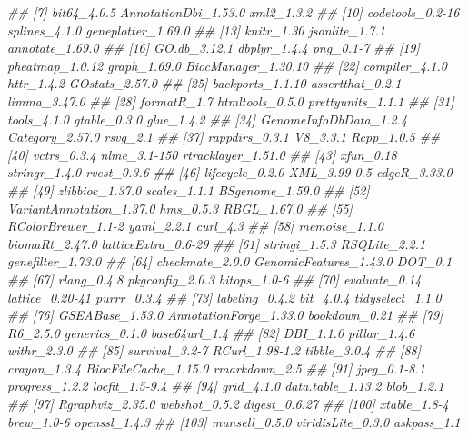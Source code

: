 \documentclass[14pt,]{article}
\newcommand{\hlcom}[1]{\textcolor[rgb]{0.502,0.502,0.502}{\textit{#1}}}%
\newenvironment{Shaded}{\begin{myshaded}}{\end{myshaded}}
\newcommand{\CommentTok}[1]{\hlcom{#1}}
\begin{document}
\begin{Shaded}
\begin{Highlighting}[]
\CommentTok{##   [7] bit64_4.0.5              AnnotationDbi_1.53.0     xml2_1.3.2              }
\CommentTok{##  [10] codetools_0.2-16         splines_4.1.0            geneplotter_1.69.0      }
\CommentTok{##  [13] knitr_1.30               jsonlite_1.7.1           annotate_1.69.0         }
\CommentTok{##  [16] GO.db_3.12.1             dbplyr_1.4.4             png_0.1-7               }
\CommentTok{##  [19] pheatmap_1.0.12          graph_1.69.0             BiocManager_1.30.10     }
\CommentTok{##  [22] compiler_4.1.0           httr_1.4.2               GOstats_2.57.0          }
\CommentTok{##  [25] backports_1.1.10         assertthat_0.2.1         limma_3.47.0            }
\CommentTok{##  [28] formatR_1.7              htmltools_0.5.0          prettyunits_1.1.1       }
\CommentTok{##  [31] tools_4.1.0              gtable_0.3.0             glue_1.4.2              }
\CommentTok{##  [34] GenomeInfoDbData_1.2.4   Category_2.57.0          rsvg_2.1                }
\CommentTok{##  [37] rappdirs_0.3.1           V8_3.3.1                 Rcpp_1.0.5              }
\CommentTok{##  [40] vctrs_0.3.4              nlme_3.1-150             rtracklayer_1.51.0      }
\CommentTok{##  [43] xfun_0.18                stringr_1.4.0            rvest_0.3.6             }
\CommentTok{##  [46] lifecycle_0.2.0          XML_3.99-0.5             edgeR_3.33.0            }
\CommentTok{##  [49] zlibbioc_1.37.0          scales_1.1.1             BSgenome_1.59.0         }
\CommentTok{##  [52] VariantAnnotation_1.37.0 hms_0.5.3                RBGL_1.67.0             }
\CommentTok{##  [55] RColorBrewer_1.1-2       yaml_2.2.1               curl_4.3                }
\CommentTok{##  [58] memoise_1.1.0            biomaRt_2.47.0           latticeExtra_0.6-29     }
\CommentTok{##  [61] stringi_1.5.3            RSQLite_2.2.1            genefilter_1.73.0       }
\CommentTok{##  [64] checkmate_2.0.0          GenomicFeatures_1.43.0   DOT_0.1                 }
\CommentTok{##  [67] rlang_0.4.8              pkgconfig_2.0.3          bitops_1.0-6            }
\CommentTok{##  [70] evaluate_0.14            lattice_0.20-41          purrr_0.3.4             }
\CommentTok{##  [73] labeling_0.4.2           bit_4.0.4                tidyselect_1.1.0        }
\CommentTok{##  [76] GSEABase_1.53.0          AnnotationForge_1.33.0   bookdown_0.21           }
\CommentTok{##  [79] R6_2.5.0                 generics_0.1.0           base64url_1.4           }
\CommentTok{##  [82] DBI_1.1.0                pillar_1.4.6             withr_2.3.0             }
\CommentTok{##  [85] survival_3.2-7           RCurl_1.98-1.2           tibble_3.0.4            }
\CommentTok{##  [88] crayon_1.3.4             BiocFileCache_1.15.0     rmarkdown_2.5           }
\CommentTok{##  [91] jpeg_0.1-8.1             progress_1.2.2           locfit_1.5-9.4          }
\CommentTok{##  [94] grid_4.1.0               data.table_1.13.2        blob_1.2.1              }
\CommentTok{##  [97] Rgraphviz_2.35.0         webshot_0.5.2            digest_0.6.27           }
\CommentTok{## [100] xtable_1.8-4             brew_1.0-6               openssl_1.4.3           }
\CommentTok{## [103] munsell_0.5.0            viridisLite_0.3.0        askpass_1.1}
\end{Highlighting}
\end{Shaded}
\end{document}
